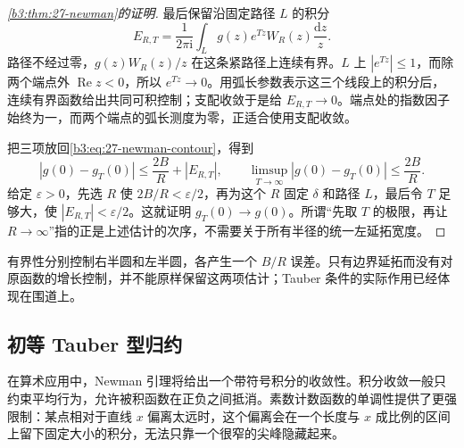 \begin{proof}[\cref{b3:thm:27-newman}的证明]
最后保留沿固定路径 \(L\) 的积分
\[
 E_{R,T}=\frac1{2\pi\mathrm i}\int_L
            g(z)e^{Tz}W_R(z)\frac{\mathrm dz}{z}.
\]
路径不经过零，\(g(z)W_R(z)/z\) 在这条紧路径上连续有界。\(L\) 上 \(|e^{Tz}|\le1\)，而除两个端点外 \(\operatorname{Re}z<0\)，所以 \(e^{Tz}\to0\)。用弧长参数表示这三个线段上的积分后，连续有界函数给出共同可积控制；支配收敛于是给 \(E_{R,T}\to0\)。端点处的指数因子始终为一，而两个端点的弧长测度为零，正适合使用支配收敛。

把三项放回\eqref{b3:eq:27-newman-contour}，得到
\[
 |g(0)-g_T(0)|\le\frac{2B}{R}+|E_{R,T}|,
 \qquad
 \limsup_{T\to\infty}|g(0)-g_T(0)|\le\frac{2B}{R}.
\]
给定 \(\varepsilon>0\)，先选 \(R\) 使 \(2B/R<\varepsilon/2\)，再为这个 \(R\) 固定 \(\delta\) 和路径 \(L\)，最后令 \(T\) 足够大，使 \(|E_{R,T}|<\varepsilon/2\)。这就证明 \(g_T(0)\to g(0)\)。所谓“先取 \(T\) 的极限，再让 \(R\to\infty\)”指的正是上述估计的次序，不需要关于所有半径的统一左延拓宽度。
\end{proof}

有界性分别控制右半圆和左半圆，各产生一个 \(B/R\) 误差。只有边界延拓而没有对原函数的增长控制，并不能原样保留这两项估计；Tauber 条件的实际作用已经体现在围道上。

\subsection{初等 Tauber 型归约}
\label{b3:subsec:270603}

在算术应用中，Newman 引理将给出一个带符号积分的收敛性。积分收敛一般只约束平均行为，允许被积函数在正负之间抵消。素数计数函数的单调性提供了更强限制：某点相对于直线 \(x\) 偏离太远时，这个偏离会在一个长度与 \(x\) 成比例的区间上留下固定大小的积分，无法只靠一个很窄的尖峰隐藏起来。

